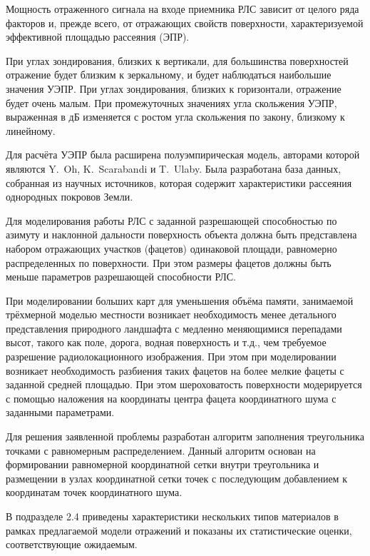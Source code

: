 Мощность отраженного сигнала на входе приемника РЛС зависит от целого ряда факторов и,
прежде всего, от отражающих свойств поверхности, характеризуемой эффективной площадью
рассеяния (ЭПР).

При углах зондирования, близких к вертикали, для большинства поверхностей отражение будет
близким к зеркальному, и будет наблюдаться наибольшие значения УЭПР. При углах
зондирования, близких к горизонтали, отражение будет очень малым. При промежуточных
значениях угла скольжения УЭПР, выраженная в дБ изменяется с ростом угла скольжения по
закону, близкому к линейному.

Для расчёта УЭПР была расширена полуэмпирическая модель, авторами которой являются Y.~Oh, K.~Scarabandi и T.~Ulaby\autocite{backscattering-soil}.
Была разработана база данных, собранная из научных источников, которая содержит
характеристики рассеяния однородных покровов Земли.

Для моделирования работы РЛС с заданной разрешающей способностью по азимуту и наклонной
дальности поверхность объекта должна быть представлена набором отражающих участков
(фацетов) одинаковой площади, равномерно распределенных по поверхности. При этом размеры
фацетов должны быть меньше параметров разрешающей способности РЛС.

При моделировании больших карт для уменьшения объёма памяти, занимаемой трёхмерной моделью
местности возникает необходимость менее детального представления природного ландшафта с
медленно меняющимися перепадами высот, такого как поле, дорога, водная поверхность и т.д.,
чем требуемое разрешение радиолокационного изображения. При этом при моделировании
возникает необходимость разбиения таких фацетов на более мелкие фацеты с заданной средней
площадью. При этом шероховатость поверхности модерируется с помощью наложения на
координаты центра фацета координатного шума с заданными параметрами.

Для решения заявленной проблемы разработан алгоритм заполнения треугольника точками с
равномерным распределением.
Данный алгоритм основан на формировании равномерной координатной сетки внутри треугольника
и размещении в узлах координатной сетки точек с последующим добавлением к координатам точек координатного шума.

В подразделе 2.4 приведены характеристики нескольких типов материалов в рамках предлагаемой модели отражений и
показаны их статистические оценки, соответствующие ожидаемым.


